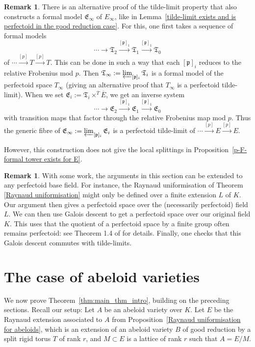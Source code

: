 \documentclass[10pt,oneside]{amsart}
\theoremstyle{definition}
\newtheorem{remark}[theorem]{Remark}
\begin{document}
	
	\begin{remark}
		There is an alternative proof of the tilde-limit property that also constructs a formal model $\mathfrak E_\infty$ of $E_\infty$, like in Lemma~\ref{tilde-limit exists and is perfectoid in the good reduction case}. For this, one first takes a sequence of formal models 
		\[\cdots \to \mathfrak T_{2}\xrightarrow{[\mathfrak p]_1}\mathfrak T_1\xrightarrow{[\mathfrak p]_1} \mathfrak T_0\]
		of $\cdots\xrightarrow{[p]} T\xrightarrow{[p]} T$. This can be done in such a way that each $[\mathfrak p]_i$ reduces to the relative Frobenius mod $p$. Then $\mathfrak T_\infty:=\varprojlim_{[\mathfrak p]_i}\mathfrak T_i$ is a formal model of the perfectoid space $T_\infty$ (giving an alternative proof that $T_\infty$ is a perfectoid tilde-limit). When we set $\mathfrak E_i:=\mathfrak T_i\times^{\overline{T}}\overline{E}$, we get an inverse system
		\[\cdots \to \mathfrak E_{2}\xrightarrow{[\mathfrak p]_1}\mathfrak E_1\xrightarrow{[\mathfrak p]_1} \mathfrak E_0\]
		with transition maps that factor through the relative Frobenius map mod $p$. Thus the generic fibre of $\mathfrak E_\infty:=\varprojlim_{[\mathfrak p]_i}\mathfrak E_i$ is a perfectoid tilde-limit of $\cdots \xrightarrow{[p]}E\xrightarrow{[p]}E$.
		
		However, this construction does not give the local splittings in Proposition~\ref{p-F-formal tower exists for E}.
	\end{remark}
	
	\begin{remark}\label{general fields for E}
	With some work, the arguments in this section can be extended to any perfectoid base field. For instance, the Raynaud uniformisation of Theorem \ref{Raynaud uniformisation} might only be defined over a finite extension $L$ of $K$. Our argument then gives a perfectoid space over the (necessarily perfectoid) field $L$. We can then use Galois descent to get a perfectoid space over our original field $K$. This uses that the quotient of a perfectoid space by a finite group often remains perfectoid: see Theorem 1.4 of \cite{Hansen_quotients} for details. Finally, one checks that this Galois descent commutes with tilde-limits. 
	\end{remark}

	
	\section{The case of abeloid varieties}\label{The case of abeloid varieties}
	We now prove Theorem~\ref{thm:main_thm_intro}, building on the preceding sections. Recall our setup: Let $A$ be an abeloid variety over $K$. Let $E$ be the Raynaud extension associated to $A$ from Proposition~\ref{Raynaud uniformisation for abeloids}, which is an extension of an abeloid variety $B$ of good reduction by a split rigid torus $T$ of rank $r$, and $M\subset E$  is a lattice of rank $r$ such that $A=E/M$. 
\end{document}
